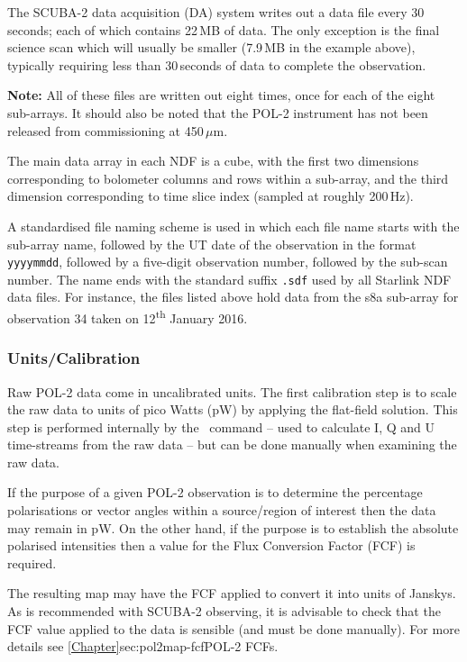 The SCUBA-2 data acquisition (DA) system writes out a data file every
30\,seconds; each of which contains 22\,MB of data. The only exception
is the final science scan which will usually be smaller (7.9\,MB in
the example above), typically requiring less than 30\,seconds of data
to complete the observation.

\textbf{Note:} All of these files are written out eight times, once
for each of the eight sub-arrays. It should also be noted that the
POL-2 instrument has not been released from commissioning at 450\,$\mu$m.

The main data array in each NDF is a cube, with the first two
dimensions corresponding to bolometer columns and rows within a
sub-array, and the third dimension corresponding to time slice index
(sampled at roughly 200\,Hz).

A standardised file naming scheme is used in which each file name
starts with the sub-array name, followed by the UT date of the
observation in the format \texttt{yyyymmdd}, followed by a five-digit
observation number, followed by the sub-scan number. The name ends
with the standard suffix \texttt{.sdf} used by all Starlink NDF data
files. For instance, the files listed above hold data from the s8a
sub-array for observation 34 taken on 12\textsuperscript{th} January
2016.




\subsubsection*{Units/Calibration}

Raw POL-2 data come in uncalibrated units. The first calibration step
is to scale the raw data to units of pico Watts (pW) by applying the
flat-field solution. This step is performed internally by the \SMURF\
command  -- used to calculate
I, Q and U time-streams from the
raw data -- but can be done manually when examining the raw data.

If the purpose of a given POL-2 observation is to determine the
percentage polarisations or vector angles within a source/region of
interest then the data may remain in pW. On the other hand, if the
purpose is to establish the absolute polarised intensities then a
value for the Flux Conversion Factor (FCF) is required.

The resulting map may have the FCF applied to convert it into units of
Janskys. As is recommended with SCUBA-2 observing, it is advisable to
check that the FCF value applied to the data is sensible (and must be
done manually). For more details see
\cref{Chapter}{sec:pol2map-fcf}{POL-2 FCFs}.






